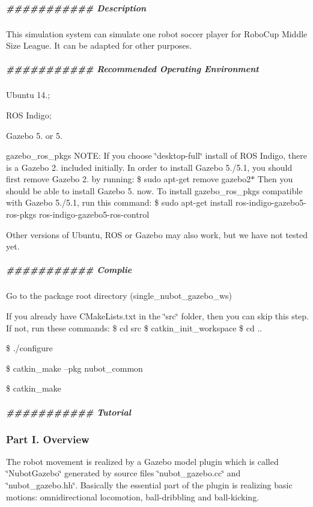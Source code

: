 \subparagraph*{\#\#\#\#\#\#\#\#\#\#\# Description}

This simulation system can simulate one robot soccer player for Robo\-Cup Middle Size League. It can be adapted for other purposes.

\subparagraph*{\#\#\#\#\#\#\#\#\#\#\# Recommended Operating Environment}


\begin{DoxyEnumerate}
\item Ubuntu 14.;
\item R\-O\-S Indigo;
\item Gazebo 5. or 5.
\item gazebo\-\_\-ros\-\_\-pkgs N\-O\-T\-E\-: If you choose \char`\"{}desktop-\/full\char`\"{} install of R\-O\-S Indigo, there is a Gazebo 2. included initially. In order to install Gazebo 5./5.1, you should first remove Gazebo 2. by running\-: \$ sudo apt-\/get remove gazebo2$\ast$ Then you should be able to install Gazebo 5. now. To install gazebo\-\_\-ros\-\_\-pkgs compatible with Gazebo 5./5.1, run this command\-: \$ sudo apt-\/get install ros-\/indigo-\/gazebo5-\/ros-\/pkgs ros-\/indigo-\/gazebo5-\/ros-\/control
\end{DoxyEnumerate}

Other versions of Ubuntu, R\-O\-S or Gazebo may also work, but we have not tested yet.

\subparagraph*{\#\#\#\#\#\#\#\#\#\#\# Complie}


\begin{DoxyEnumerate}
\item Go to the package root directory (single\-\_\-nubot\-\_\-gazebo\-\_\-ws)
\item If you already have C\-Make\-Lists.\-txt in the \char`\"{}src\char`\"{} folder, then you can skip this step. If not, run these commands\-: \$ cd src \$ catkin\-\_\-init\-\_\-workspace \$ cd ..
\item \$ ./configure
\item \$ catkin\-\_\-make --pkg nubot\-\_\-common
\item \$ catkin\-\_\-make
\end{DoxyEnumerate}

\subparagraph*{\#\#\#\#\#\#\#\#\#\#\# Tutorial}

\subsubsection*{Part I. Overview}

The robot movement is realized by a Gazebo model plugin which is called \char`\"{}\-Nubot\-Gazebo\char`\"{} generated by source files \char`\"{}nubot\-\_\-gazebo.\-cc\char`\"{} and \char`\"{}nubot\-\_\-gazebo.\-hh\char`\"{}. Basically the essential part of the plugin is realizing basic motions\-: omnidirectional locomotion, ball-\/dribbling and ball-\/kicking.

